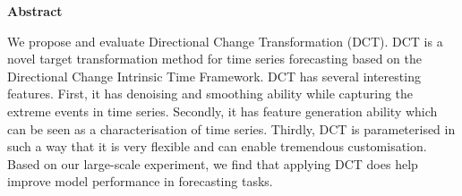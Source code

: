 \begin{center}

    \vspace*{2cm}

    {\textbf{Abstract}}

    \vspace*{1cm}

\end{center}

\begin{doublespace}
    We propose and evaluate Directional Change Transformation (DCT). DCT is a novel target transformation method for time series forecasting based on the Directional Change Intrinsic Time Framework. DCT has several interesting features. First, it has denoising and smoothing ability while capturing the extreme events in time series. Secondly, it has feature generation ability which can be seen as a characterisation of time series. Thirdly, DCT is parameterised in such a way that it is very flexible and can enable tremendous customisation. Based on our large-scale experiment, we find that applying DCT does help improve model performance in forecasting tasks.
\end{doublespace}

\newpage
